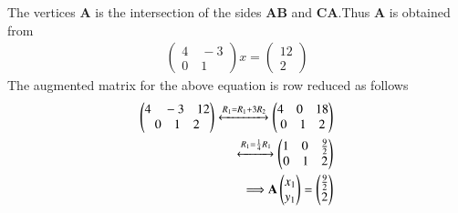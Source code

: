 \documentclass[journal,12pt,twocolumn]{IEEEtran}
\newcommand{\myvec}[1]{\ensuremath{\begin{pmatrix}#1\end{pmatrix}}}
\numberwithin{equation}{subsection}
\let\vec\mathbf
\begin{document}
 The vertices $\vec{A}$ is the intersection of the sides $\vec{AB}$ and $\vec{CA}$.Thus $\vec{A}$ is obtained from
 \begin{align}
 \myvec{4\quad-3\\0\quad1}x=\myvec{12\\2}
 \end{align}
 The augmented matrix for the above equation is row reduced as follows
 \begin{align}
 \myvec{4\quad-3\quad 12\\0\quad1\quad2}\xleftrightarrow{R_1=R_1+3R_2}\myvec{4\quad0\quad 18\\0\quad1\quad2}\\\xleftrightarrow{R_1=\frac{1}{4}R_1}\myvec{1\quad0\quad\frac{9}{2}\\0\quad1\quad2}\\
 \Longrightarrow\vec{A}\myvec{x_1 \\y_1}=\myvec{\frac{9}{2}\\2}
 \end{align}
 
\end{document}
